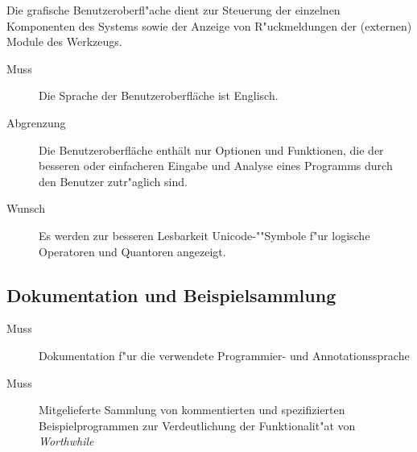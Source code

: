 Die grafische Benutzeroberfl"ache dient zur Steuerung der einzelnen Komponenten des Systems sowie der Anzeige von R"uckmeldungen der (externen) Module des Werkzeugs.%

\begin{description}%
    \item [Muss] Die Sprache der Benutzeroberfläche ist Englisch.%
    \item [Abgrenzung] Die Benutzeroberfläche enthält nur Optionen und Funktionen, die der besseren oder einfacheren Eingabe und Analyse eines Programms durch den Benutzer zutr"aglich sind.%
    \item [Wunsch] Es werden zur besseren Lesbarkeit Unicode-""Symbole f"ur logische Operatoren und Quantoren angezeigt.%
\end{description}%

\subsection{Dokumentation und Beispielsammlung}%

\begin{description}%
    \item [Muss] Dokumentation f"ur die verwendete Programmier- und Annotationssprache%
    \item [Muss] Mitgelieferte Sammlung von kommentierten und spezifizierten Beispielprogrammen zur Verdeutlichung der Funktionalit"at von \textit{Worthwhile}%
\end{description}%

